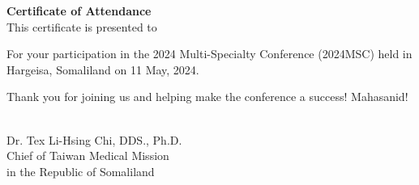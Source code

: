 \documentclass[a4paper, landscape]{article}
\begin{document}
\begin{center}

{\Huge\textbf{Certificate of Attendance}}\\[0.6cm]

\raisebox{-0.6\height}{}  \hspace{0.3cm}
This certificate is presented to \hspace{0.3cm}
\raisebox{-0.6\height}{} \\[0.5cm]

{\Huge\underline{\hspace{10cm}}}

\vspace{0.1cm}




\begin{flushleft}
\Large



\vspace{0.5cm}

For your participation in the 2024 Multi-Specialty Conference (2024MSC)  
held in Hargeisa, Somaliland on 11 May, 2024.


\vspace{1cm}

Thank you for joining us and helping make the conference a success!
Mahasanid!
\end{flushleft}\\[0.5cm]



\large
Dr. Tex Li-Hsing Chi, DDS., Ph.D.\\
Chief of Taiwan Medical Mission\\
in the Republic of Somaliland

\end{center}



\clearpage






\end{document}
